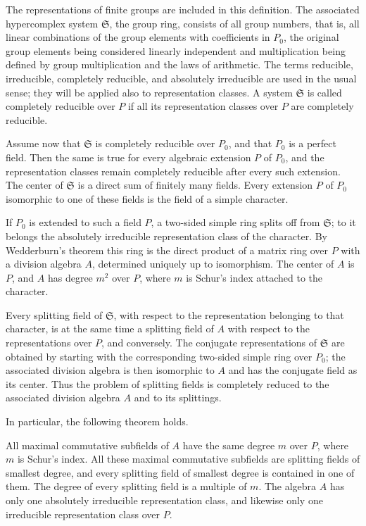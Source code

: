 \documentclass[11pt]{article}
\begin{document}
The representations of finite groups are included in this definition.
The associated hypercomplex system \(\mathfrak S\), the group ring,
consists of all group numbers, that is, all linear combinations of the
group elements with coefficients in \(P_0\), the original group elements
being considered linearly independent and multiplication being defined
by group multiplication and the laws of arithmetic. The terms reducible,
irreducible, completely reducible, and absolutely irreducible are used
in the usual sense; they will be applied also to representation classes.
A system \(\mathfrak S\) is called completely reducible over \(P\) if
all its representation classes over \(P\) are completely reducible.

Assume now that \(\mathfrak S\) is completely reducible over \(P_0\),
and that \(P_0\) is a perfect field. Then the same is true for every
algebraic extension \(P\) of \(P_0\), and the representation classes
remain completely reducible after every such extension. The center of
\(\mathfrak S\) is a direct sum of finitely many fields. Every extension
\(P\) of \(P_0\) isomorphic to one of these fields is the field of a
simple character.

If \(P_0\) is extended to such a field \(P\), a two-sided simple ring
splits off from \(\mathfrak S\); to it belongs the absolutely
irreducible representation class of the character. By Wedderburn's
theorem this ring is the direct product of a matrix ring over \(P\) with
a division algebra \(A\), determined uniquely up to isomorphism. The
center of \(A\) is \(P\), and \(A\) has degree \(m^2\) over \(P\), where
\(m\) is Schur's index attached to the character.

Every splitting field of \(\mathfrak S\), with respect to the
representation belonging to that character, is at the same time a
splitting field of \(A\) with respect to the representations over \(P\),
and conversely. The conjugate representations of \(\mathfrak S\) are
obtained by starting with the corresponding two-sided simple ring over
\(P_0\); the associated division algebra is then isomorphic to \(A\) and
has the conjugate field as its center. Thus the problem of splitting
fields is completely reduced to the associated division algebra \(A\)
and to its splittings.

In particular, the following theorem holds.

All maximal commutative subfields of \(A\) have the same degree \(m\)
over \(P\), where \(m\) is Schur's index. All these maximal commutative
subfields are splitting fields of smallest degree, and every splitting
field of smallest degree is contained in one of them. The degree of
every splitting field is a multiple of \(m\). The algebra \(A\) has only
one absolutely irreducible representation class, and likewise only one
irreducible representation class over \(P\).
\end{document}
